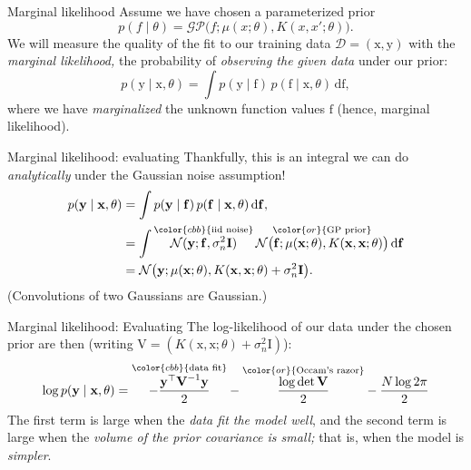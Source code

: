 \documentclass[xcolor={dvipsnames},hyperref={breaklinks=true},12pt]{beamer}
\newcommand{\given}{\mid}
\newcommand{\mc}[1]{\mathcal{#1}}
\newcommand{\data}{\mc{D}}
\newcommand{\intd}[1]{\,\mathrm{d}{#1}}
\newcommand{\trans}{^\top}
\renewcommand{\vec}[1]{\bm{\mathrm{#1}}}
\newcommand{\emphr}[1]{{\textcolor{or}{\itshape #1}}}
\newcommand{\maker}[1]{{\color{or}{#1}}}
\newcommand{\makeb}[1]{{\color{cbb}{#1}}}
\begin{document}
\begin{frame}{Marginal likelihood}
  Assume we have chosen a parameterized prior
  \begin{equation*}
    p(f \given \theta) = \mc{GP}\bigl(f; \mu(x; \theta), K(x, x'; \theta)\bigr).
  \end{equation*}
  We will measure the quality of the fit to our training data $\data
  = (\vec{x}, \vec{y})$ with the \emphr{marginal likelihood,} the
  probability of \emphr{observing the given data} under our prior:
  \begin{equation*}
    p(\vec{y} \given \vec{x}, \theta) = \int p(\vec{y} \given \vec{f}) \, p(\vec{f} \given \vec{x}, \theta) \intd{\vec{f}},
  \end{equation*}
  where we have \emphr{marginalized} the unknown function values
  $\vec{f}$ (hence, marginal likelihood).
\end{frame}

\begin{frame}{Marginal likelihood: evaluating}
  Thankfully, this is an integral we can do \emphr{analytically} under
  the Gaussian noise assumption!
  \begin{align*}
    p(\vec{y} \given \vec{x}, \theta)
    &=
    \int p(\vec{y} \given \vec{f}) \, p(\vec{f} \given \vec{x}, \theta) \intd{\vec{f}},
    \\
    &=
    \int \overset{\makeb{\text{iid noise}}}{\mc{N}(\vec{y}; \vec{f}, \sigma_n^2 \vec{I})} \,
    \overset{\maker{\text{GP prior}}}{\mc{N}\bigl(\vec{f}; \mu(\vec{x}; \theta), K(\vec{x}, \vec{x}; \theta) \bigr)} \intd{\vec{f}}
    \\
    &=
    \mc{N}\bigl(\vec{y}; \mu(\vec{x}; \theta), K(\vec{x}, \vec{x}; \theta) + \sigma_n^2 \vec{I}\bigr).
  \end{align*}
  (Convolutions of two Gaussians are Gaussian.)
\end{frame}

\begin{frame}{Marginal likelihood: Evaluating}
  The log-likelihood of our data under the chosen prior are then
  (writing $\vec{V} = (K(\vec{x}, \vec{x}; \theta) + \sigma_n^2 \vec{I})$):
  \begin{equation*}
    \log p(\vec{y} \given \vec{\vec{x}}, \theta)
    =
    \overset{\makeb{\text{data fit}}}
            {-\frac{\vec{y}\trans\vec{V}^{-1}\vec{y}}{2}}
            -
    \overset{\maker{\text{Occam's razor}}}
            {\frac{\log \det \vec{V}}{2}}
            - \frac{N \log 2\pi}{2}
  \end{equation*}
  The first term is large when the \emphr{data fit the model well},
  and the second term is large when the \emphr{volume of the prior
    covariance is small;} that is, when the model is \emphr{simpler}.
\end{frame}
\end{document}
